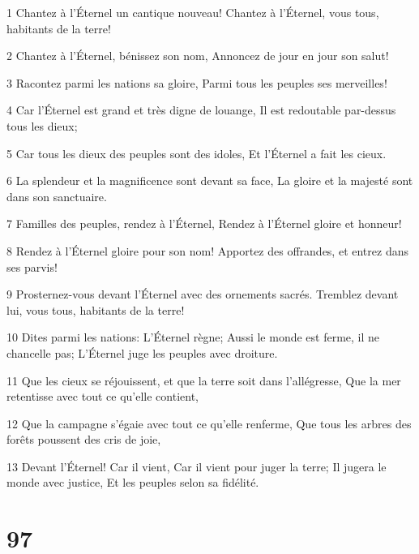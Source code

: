 \par 1 Chantez à l'Éternel un cantique nouveau! Chantez à l'Éternel, vous tous, habitants de la terre!
\par 2 Chantez à l'Éternel, bénissez son nom, Annoncez de jour en jour son salut!
\par 3 Racontez parmi les nations sa gloire, Parmi tous les peuples ses merveilles!
\par 4 Car l'Éternel est grand et très digne de louange, Il est redoutable par-dessus tous les dieux;
\par 5 Car tous les dieux des peuples sont des idoles, Et l'Éternel a fait les cieux.
\par 6 La splendeur et la magnificence sont devant sa face, La gloire et la majesté sont dans son sanctuaire.
\par 7 Familles des peuples, rendez à l'Éternel, Rendez à l'Éternel gloire et honneur!
\par 8 Rendez à l'Éternel gloire pour son nom! Apportez des offrandes, et entrez dans ses parvis!
\par 9 Prosternez-vous devant l'Éternel avec des ornements sacrés. Tremblez devant lui, vous tous, habitants de la terre!
\par 10 Dites parmi les nations: L'Éternel règne; Aussi le monde est ferme, il ne chancelle pas; L'Éternel juge les peuples avec droiture.
\par 11 Que les cieux se réjouissent, et que la terre soit dans l'allégresse, Que la mer retentisse avec tout ce qu'elle contient,
\par 12 Que la campagne s'égaie avec tout ce qu'elle renferme, Que tous les arbres des forêts poussent des cris de joie,
\par 13 Devant l'Éternel! Car il vient, Car il vient pour juger la terre; Il jugera le monde avec justice, Et les peuples selon sa fidélité.

\chapter{97}

